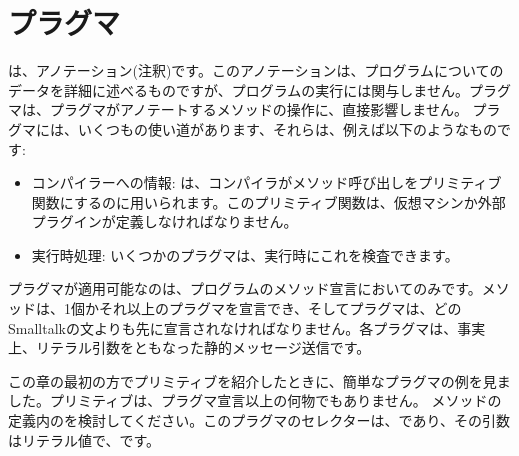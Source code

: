 \documentclass[a4paper,10pt,twoside]{book}
\begin{document}
\section{プラグマ}

は、アノテーション(注釈)です。このアノテーションは、プログラムについてのデータを詳細に述べるものですが、プログラムの実行には関与しません。プラグマは、プラグマがアノテートするメソッドの操作に、直接影響しません。
プラグマには、いくつもの使い道があります、それらは、例えば以下のようなものです:
\begin{itemize}
\item コンパイラーへの情報: は、コンパイラがメソッド呼び出しをプリミティブ関数にするのに用いられます。このプリミティブ関数は、仮想マシンか外部プラグインが定義しなければなりません。
\item 実行時処理: いくつかのプラグマは、実行時にこれを検査できます。%
\end{itemize}

プラグマが適用可能なのは、プログラムのメソッド宣言においてのみです。メソッドは、1個かそれ以上のプラグマを宣言でき、そしてプラグマは、どのSmalltalkの文よりも先に宣言されなければなりません。各プラグマは、事実上、リテラル引数をともなった静的メッセージ送信です。

この章の最初の方でプリミティブを紹介したときに、簡単なプラグマの例を見ました。プリミティブは、プラグマ宣言以上の何物でもありません。 
メソッドの定義内のを検討してください。このプラグマのセレクターは、であり、その引数はリテラル値で、です。%
\end{document}
